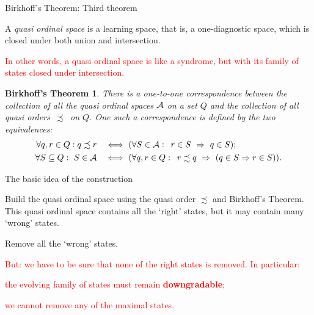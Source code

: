 \documentclass{beamer}
\newtheorem{birkhoff}[theorem]{Birkhoff's Theorem}
\def\vtl{\vskip 1mm}
\def\tl{\vskip 2mm}
\def\itbul{\item[$\bullet$]}
\def\SB{\subseteq}
\def\EQ{\Longleftrightarrow}
\def\AAA{{\cal A}}
\def\rtxt#1{\textcolor{red}{#1}}
\begin{document}
\begin{frame}{Birkhoff's Theorem: Third theorem}
\vspace{-.3cm}

\begin{definition} A {\sl quasi ordinal space} is a learning space, that is, a one-diagnostic space, which is closed under both union and intersection.
\end{definition}
\vtl
\rtxt{In other words, a quasi ordinal space is like a syndrome, but with its family of states closed under intersection.}
\vtl
\begin{birkhoff} There is a one-to-one correspondence between the collection of all the quasi ordinal spaces  $\AAA$ on a set $Q$ and the collection of all quasi orders\, $\precsim$\, on $Q$. One such a correspondence is defined by the two equivalences:
 \begin{align*}
 \forall q,r\in Q: q\precsim r\quad&\EQ\,\, (\forall S\in \AAA:\,\,\, r\in S\,\, \Rightarrow\,\, q\in S);\\
 \label{q_ordinal_2}
\forall S\SB Q:\,\, S\in\AAA \quad&\EQ\,\,(\forall q,r\in Q:\,\ r \precsim q \,\,\Rightarrow\,\,( q\in S\Rightarrow r\in S)).
 \end{align*}
\end{birkhoff}
 \vspace{.1cm}

\end{frame}
\begin{frame}{The basic idea of  the construction}
\center
\begin{minipage}{10cm} 
\begin{roster}
\item Build the quasi ordinal space using the quasi order $\precsim$ and Birkhoff's Theorem. This quasi ordinal space contains all the `right' states, but it may contain many `wrong' states.
\item  Remove all the `wrong' states.
\end{roster}
\tl
\rtxt{ But: we have to be sure that none of the right states is removed. In particular:
\begin{roster}
\itbul the evolving family of states must remain {\bf downgradable};
\itbul we cannot remove any of the maximal states.
\end{roster}  }

\end{minipage}
 \vspace{.5cm}

\end{frame}
\end{document}
